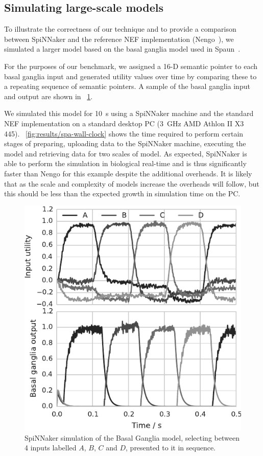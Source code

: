 \documentclass[conference]{IEEEtran}
\begin{document}
  \subsection{Simulating large-scale models}
  \label{sec:spa-sequence}

  To illustrate the correctness of our technique and to provide a comparison between SpiNNaker and the reference NEF implementation (Nengo~\parencite{Bekolay2014}), we simulated a larger model based on the basal ganglia model used in Spaun~\parencite{Stewart2010}.

  For the purposes of our benchmark, we assigned a 16-D semantic pointer to each basal ganglia input and generated utility values over time by comparing these to a repeating sequence of semantic pointers. A sample of the basal ganglia input and output are shown in \figurename~\ref{fig:results/basal_ganglia}.

  We simulated this model for \SI{10}{\second} using a SpiNNaker machine and the standard NEF implementation on a standard desktop PC (\SI{3}{\giga\hertz} AMD Athlon II X3 445).
  \figurename~\ref{fig:results/spa-wall-clock} shows the time required to perform certain stages of preparing, uploading data to the SpiNNaker machine, executing the model and retrieving data for two scales of model.
  As expected, SpiNNaker is able to perform the simulation in biological real-time and is thus significantly faster than Nengo for this example despite the additional overheads.
  It is likely that as the scale and complexity of models increase the overheads will follow, but this should be less than the expected growth in simulation time on the PC.

  \begin{figure}[!t]
    \includegraphics{figures/basal_ganglia}
    \caption{SpiNNaker simulation of the Basal Ganglia model, selecting between 4 inputs labelled $A$, $B$, $C$ and $D$, presented to it in sequence.}
    \label{fig:results/basal_ganglia}
  \end{figure}
\end{document}
